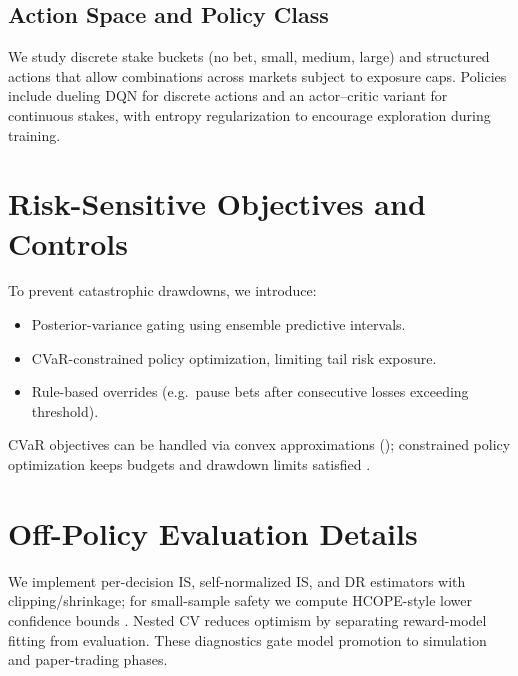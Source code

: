
\subsection{Action Space and Policy Class}
We study discrete stake buckets (no bet, small, medium, large) and structured actions that allow combinations across markets subject to exposure caps. Policies include dueling DQN for discrete actions and an actor--critic variant for continuous stakes, with entropy regularization to encourage exploration during training.

\section{Risk-Sensitive Objectives and Controls}
To prevent catastrophic drawdowns, we introduce:
\begin{itemize}
  \item Posterior-variance gating using ensemble predictive intervals.
  \item CVaR-constrained policy optimization, limiting tail risk exposure.
  \item Rule-based overrides (e.g.\ pause bets after consecutive losses exceeding threshold).
\end{itemize}
CVaR objectives can be handled via convex approximations (); constrained policy optimization keeps budgets and drawdown limits satisfied \citep{achiam2017cpo,tamar2015cvar}.

\section{Off-Policy Evaluation Details}
We implement per-decision IS, self-normalized IS, and DR estimators with clipping/shrinkage; for small-sample safety we compute HCOPE-style lower confidence bounds \citep{thomas2015}. Nested CV reduces optimism by separating reward-model fitting from evaluation. These diagnostics gate model promotion to simulation and paper-trading phases.

